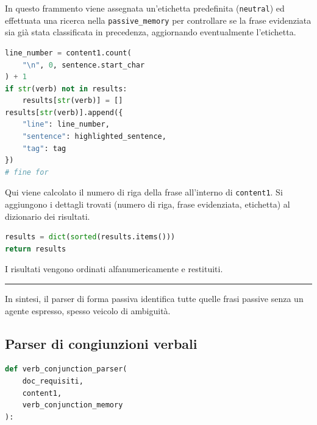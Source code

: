 \documentclass[12pt]{report}
\begin{document}
\noindent In questo frammento viene assegnata un'etichetta predefinita (\texttt{neutral}) ed effettuata una ricerca nella \texttt{passive\_memory} per controllare se la frase evidenziata sia già stata classificata in precedenza, aggiornando eventualmente l'etichetta.


\begin{mdframed}
\small
\begin{lstlisting}[language=Python]
line_number = content1.count(
    "\n", 0, sentence.start_char
) + 1
if str(verb) not in results:
    results[str(verb)] = []
results[str(verb)].append({
    "line": line_number,
    "sentence": highlighted_sentence,
    "tag": tag
})
# fine for
\end{lstlisting}
\end{mdframed}

\noindent Qui viene calcolato il numero di riga della frase all'interno di \texttt{content1}. Si aggiungono i dettagli trovati (numero di riga, frase evidenziata, etichetta) al dizionario dei risultati.


\begin{mdframed}
\small
\begin{lstlisting}[language=Python]
results = dict(sorted(results.items()))
return results
\end{lstlisting}
\end{mdframed}

\noindent I risultati vengono ordinati alfanumericamente e restituiti.

{\centering \rule{0.5\linewidth}{0.1pt} \par\vspace{0.25cm}}

In sintesi, il \textsf{parser di forma passiva} identifica tutte quelle frasi passive senza un agente espresso, spesso veicolo di ambiguità.


\subsection{Parser di congiunzioni verbali}

\begin{mdframed}
\small
\begin{lstlisting}[language=Python]
def verb_conjunction_parser(
    doc_requisiti,
    content1,
    verb_conjunction_memory
):
\end{lstlisting}
\end{mdframed}
\end{document}
